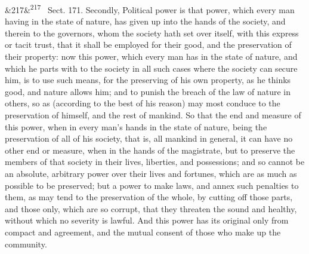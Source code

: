 \documentclass[12pt]{article}
\newcommand{\para}[1][]{\par\noindent\ifx&#1&\else\textsuperscript{\footnotesize #1}~\fi}
\begin{document}
\para[217] Sect. 171. Secondly, Political power is that power, which every man having in the state of nature, has given up into the hands of the society, and therein to the governors, whom the society hath set over itself, with this express or tacit trust, that it shall be employed for their good, and the preservation of their property: now this power, which every man has in the state of nature, and which he parts with to the society in all such cases where the society can secure him, is to use such means, for the preserving of his own property, as he thinks good, and nature allows him; and to punish the breach of the law of nature in others, so as (according to the best of his reason) may most conduce to the preservation of himself, and the rest of mankind. So that the end and measure of this power, when in every man's hands in the state of nature, being the preservation of all of his society, that is, all mankind in general, it can have no other end or measure, when in the hands of the magistrate, but to preserve the members of that society in their lives, liberties, and possessions; and so cannot be an absolute, arbitrary power over their lives and fortunes, which are as much as possible to be preserved; but a power to make laws, and annex such penalties to them, as may tend to the preservation of the whole, by cutting off those parts, and those only, which are so corrupt, that they threaten the sound and healthy, without which no severity is lawful. And this power has its original only from compact and agreement, and the mutual consent of those who make up the community.
\end{document}
